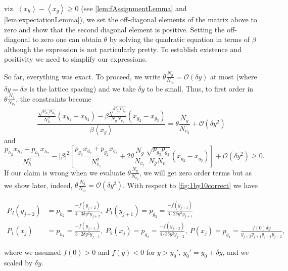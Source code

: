 \documentclass{article}
\begin{document}
viz. $\left\langle x_{h}\right\rangle -\left\langle x_{g}\right\rangle \ge0$ (see \cref{lem:fAssignmentLemma} and \cref{lem:expectationLemma}), we set the off-diagonal elements of the matrix above to zero and show
that the second diagonal element
is positive. Setting the off-diagonal to zero one can obtain $\theta$ by solving
the quadratic equation in terms of $\beta$ although the expression is not
particularly pretty. To establish existence and positivity we need
to simplify our expressions.

So far, everything was exact. To proceed, we write  $\theta\frac{N_{g}}{N_{v_{2}}}=\mathcal{O}(\delta y)$
at most (where $\delta y=\delta x$ is the lattice spacing) and we take
$\delta y$ to be small. Thus, to first order in $\theta\frac{N_{g}}{N_{v_{2}}}$, the constraints become
\begin{displaymath}
  \frac{\frac{\sqrt{p_{h_{1}}p_{h_{2}}}}{N_{h}^{2}}(x_{h_{1}}-x_{h_{2}})-\beta\frac{\sqrt{p_{g_{2}}p_{g_{3}}}}{N_{g}N_{v_{1}}}(x_{g_{2}}-x_{g_{3}})}{\beta\left\langle x_{g}\right\rangle }=\theta\frac{N_{g}}{N_{v_{2}}}+\mathcal{O}(\delta y^{2})
\end{displaymath}
and
\begin{displaymath}
  \frac{p_{h_{2}}x_{h_{1}}+p_{h_{1}}x_{h_{2}}}{N_{h}^{2}}-\left|\beta\right|^{2}\left[\frac{p_{g_{3}}x_{g_{2}}+p_{g_{2}}x_{g_{3}}}{N_{v_{1}}^{2}}+2\theta\frac{N_{g}}{N_{v_{2}}}\frac{\sqrt{p_{g_{3}}p_{g_{2}}}}{N_{g}N_{v_{1}}}(x_{g_{2}}-x_{g_{3}})\right]+\mathcal{O}(\delta y^{2})\ge0.
\end{displaymath}
If our claim is wrong when we evaluate $\theta\frac{N_{g}}{N_{v_{2}}}$,
we will get zero order terms but as we show later, indeed,
$\theta\frac{N_{g}}{N_{v_{2}}}=\mathcal{O}(\delta y^{2})$. With respect to  \cref{fig:1by10correct} we have
\begin{footnotesize}
  \begin{align*}
    P_{2}(y_{j+2}) & =p_{h_{2}}=\frac{-f(y_{j+2})}{4\cdot 3\delta y^{2}y_{j+2}},\
    P_{1}(y_{j+1}) =p_{g_{3}}=\frac{-f(y_{j+1})}{3\cdot 2\delta y^{2}y_{j+1}}      \\
    P_{1}(x_{j})   & =p_{h_{1}}=\frac{-f(y_{j-1})}{3 \cdot 2\delta y^{2}y_{j-1}},\
    P_{2}(x_{j})  =p_{g_{2}}=\frac{-f(y_{j-2})}{4 \cdot 3\delta y^{2}y_{j-2}},\
    P(x_{j})  =p_{g_{1}}=\frac{f(0)\delta y}{y_{j+2}y_{j+1}y_{j-1}y_{j-2}},
  \end{align*}
\end{footnotesize}
where we assumed $f(0)>0$ and $f(y)<0$ for $y>y_{0}'$, $y_{0}'=y_{0}+\delta y$, and we
scaled by $\delta y$.
\end{document}
